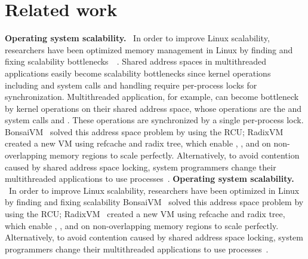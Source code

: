 \section{Related work} \label{sec:RelatedWork}
\ifkor
\noindent
\textbf{Operating system scalability.}
~\cite{Clements15SCR}In order to improve Linux scalability, researchers have
been optimized memory management in Linux by finding and fixing scalability
bottlenecks~\cite{BoydWickizer2008Corey}~\cite{BoydWickizer2012OLS}.
Shared address spaces in multithreaded applications 
easily become scalability bottlenecks since kernel operations 
including  and  system calls and 
 handling require per-process locks for synchronization.
Multithreaded application, for example, can become bottleneck by kernel
operations on their shared address space, whose operations are the 
and  system calls and .
These operations are synchronized by a single per-process lock.
BonsaiVM~\cite{AustinTClements2012RCUBalancedTrees} solved this address space
problem by using the RCU;
RadixVM~\cite{Clements2013RadixVM} created a new VM using refcache and radix
tree, which enable , , and  on
non-overlapping memory regions to scale perfectly.
Alternatively, to avoid contention caused by shared address space locking,
system programmers change their multithreaded applications to use
processes~\cite{SilasBoydWickizer2010LinuxScales48}.
\else
\noindent
\textbf{Operating system scalability.}
~\cite{Clements15SCR}In order to improve Linux scalability, researchers have
been optimized in Linux by finding and fixing scalability
BonsaiVM~\cite{AustinTClements2012RCUBalancedTrees} solved this address space
problem by using the RCU;
RadixVM~\cite{Clements2013RadixVM} created a new VM using refcache and radix
tree, which enable , , and  on
non-overlapping memory regions to scale perfectly.
Alternatively, to avoid contention caused by shared address space locking,
system programmers change their multithreaded applications to use
processes~\cite{SilasBoydWickizer2010LinuxScales48}.
\fi


